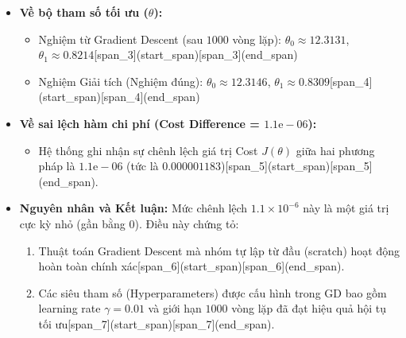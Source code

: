 \begin{itemize}
    \item \textbf{Về bộ tham số tối ưu ($\theta$):}
    \begin{itemize}
        \item Nghiệm từ Gradient Descent (sau $1000$ vòng lặp): $\theta_0 \approx 12.3131$, $\theta_1 \approx 0.8214$[span_3](start_span)[span_3](end_span)
        \item Nghiệm Giải tích (Nghiệm đúng): $\theta_0 \approx 12.3146$, $\theta_1 \approx 0.8309$[span_4](start_span)[span_4](end_span)
    \end{itemize}
    \item \textbf{Về sai lệch hàm chi phí (Cost Difference = $1.1\text{e}-06$):}
    \begin{itemize}
        \item Hệ thống ghi nhận sự chênh lệch giá trị Cost $J(\theta)$ giữa hai phương pháp là $1.1\text{e}-06$ (tức là $0.000001183$)[span_5](start_span)[span_5](end_span).
    \end{itemize}
    \item \textbf{Nguyên nhân và Kết luận:} Mức chênh lệch $1.1 \times 10^{-6}$ này là một giá trị cực kỳ nhỏ (gần bằng $0$). Điều này chứng tỏ:
    \begin{enumerate}
        \item Thuật toán Gradient Descent mà nhóm tự lập từ đầu (scratch) hoạt động hoàn toàn chính xác[span_6](start_span)[span_6](end_span).
        \item Các siêu tham số (Hyperparameters) được cấu hình trong GD bao gồm learning rate $\gamma = 0.01$ và giới hạn $1000$ vòng lặp đã đạt hiệu quả hội tụ tối ưu[span_7](start_span)[span_7](end_span).
    \end{enumerate}
\end{itemize}
